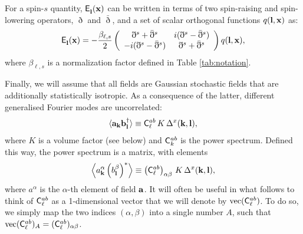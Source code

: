 \documentclass[a4paper,11pt]{article}
\newcommand{\Ylm}[3]{{\sf E}^{#1}_{\bf #2}({\bf #3})}
\begin{document}
      For a spin-$s$ quantity, $\Ylm{}{l}{x}$ can be written in terms of two spin-raising and spin-lowering operators, $\eth$ and $\bar{\eth}$, and a set of scalar orthogonal functions $q({\bf l},{\bf x})$ as:
      \begin{equation}
        \Ylm{}{l}{x}=-\frac{\beta_{\ell,s}}{2}\left(
        \begin{array}{cc}
          \eth^s+\bar{\eth}^s & i(\eth^s-\bar{\eth}^s)\\
          -i(\eth^s-\bar{\eth}^s) & \eth^s+\bar{\eth}^s
        \end{array}\right) q({\bf l},{\bf x}),
      \end{equation}
      where $\beta_{\ell,s}$ is a normalization factor defined in Table \ref{tab:notation}.
    
      Finally, we will assume that all fields are Gaussian stochastic fields
      that are additionally statistically isotropic. As a consequence of the
      latter, different generalised Fourier modes are uncorrelated:
      \begin{equation}\label{eq:iso}
        \langle {\bf a}_{\bf k}{\bf b}^\dag_{\bf l}\rangle\equiv {\sf C}^{ab}_\ell\,K\,\Delta^x({\bf k},{\bf l}),
      \end{equation}
      where $K$ is a volume factor (see below) and ${\sf C}^{ab}_k$ is the power spectrum. Defined this way, the power spectrum is a matrix, with elements
      \begin{equation}
        \left\langle a^\alpha_{\bf k}\left(b^\beta_{\bf l}\right)^*\right\rangle\equiv \left({\sf C}^{ab}_\ell\right)_{\alpha\beta}\,K\,\Delta^x({\bf k},{\bf l}),
      \end{equation}
      where $a^\alpha$ is the $\alpha$-th element of field ${\bf a}$. It will often be useful in what follows to think of ${\sf C}^{ab}_\ell$ as a 1-dimensional vector that we will denote by ${\rm vec}({\sf C}^{ab}_\ell)$. To do so, we simply map the two indices $(\alpha,\beta)$ into a single number $A$, such that ${\rm vec}({\sf C}^{ab}_\ell)_A = ({\sf C}^{ab}_\ell)_{\alpha\beta}$.
    
\end{document}
